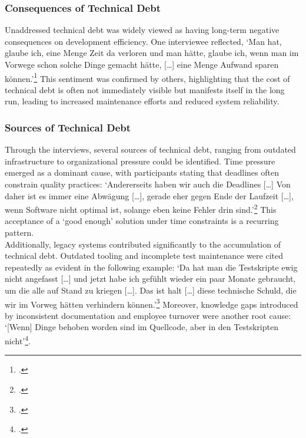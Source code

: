 \subsubsection{Consequences of Technical Debt}
Unaddressed technical debt was widely viewed as having long-term negative consequences on development efficiency. One interviewee reflected, `Man hat, glaube ich, eine Menge Zeit da verloren und man hätte, glaube ich, wenn man im Vorwege schon solche Dinge gemacht hätte, [\ldots] eine Menge Aufwand sparen können.'\footcite{interview1}
This sentiment was confirmed by others, highlighting that the cost of technical debt is often not immediately visible but manifests itself in the long run, leading to increased maintenance efforts and reduced system reliability.\\

\subsubsection{Sources of Technical Debt}
Through the interviews, several sources of technical debt, ranging from outdated infrastructure to organizational pressure could be identified. Time pressure emerged as a dominant cause, with participants stating that deadlines often constrain quality practices: `Andererseits haben wir auch die Deadlines [\ldots] Von daher ist es immer eine Abwägung
[\ldots], gerade eher gegen Ende der Laufzeit [\ldots], wenn Software nicht optimal ist, solange eben keine Fehler drin sind.'\footcite{interview2} This acceptance of a `good enough' solution under time constraints is a recurring pattern.\\

Additionally, legacy systems contributed significantly to the accumulation of technical debt. Outdated tooling and incomplete test maintenance were cited repeatedly as evident in the following example: `Da hat man die Testskripte ewig nicht angefasst [\ldots] und jetzt habe ich gefühlt wieder ein paar Monate gebraucht, um die alle auf Stand zu kriegen [\ldots].
Das ist halt [\ldots] diese technische Schuld, die wir im Vorweg hätten verhindern können.'\footcite{interview1} Moreover, knowledge gaps introduced by inconsistent documentation and employee turnover were another root cause: `[Wenn] Dinge behoben worden sind im Quellcode, aber in den Testskripten nicht'\footcite{interview1}.

